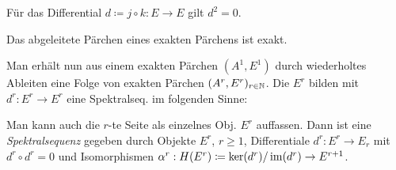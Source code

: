 \documentclass{cheat-sheet}
\newenvironment{centertikzcd}
  {\begin{center}\begin{tikzcd}}
  {\end{tikzcd}\end{center}}
\begin{document}

\begin{bem}
  Für das Differential $d \coloneqq j \circ k : E \to E$ gilt $d^2 = 0$.
\end{bem}


\begin{lem}
  Das abgeleitete Pärchen eines exakten Pärchens ist exakt.
\end{lem}

\begin{bem}
  Man erhält nun aus einem exakten Pärchen $(A^1, E^1)$ durch wiederholtes Ableiten eine Folge von exakten Pärchen $(A^r, E^r)_{r \in \mathbb{N}}$. Die $E^r$ bilden mit $d^r \!:\! E^r \!\to\! E^r$ eine Spektralseq. im folgenden Sinne:
\end{bem}

\begin{bem}
  Man kann auch die $r$-te Seite als einzelnes Obj. $E^r$ auffassen. Dann ist eine \emph{Spektralsequenz} gegeben durch Objekte $E^r$, $r \geq 1$, Differentiale $d^r : E^r \to E_r$ mit $d^r \circ d^r = 0$ und Isomorphismen $\alpha^r : H(E^r) \coloneqq \ker(d^r) / \operatorname{im}(d^r) \to E^{r+1}$.
\end{bem}
\end{document}
